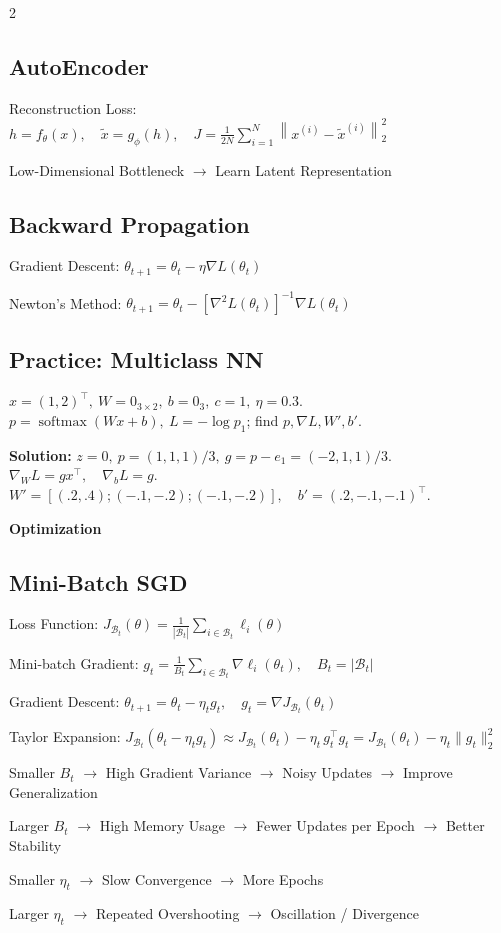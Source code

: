\documentclass[a4paper]{article}
\newcommand{\module}[1]{\par\needspace{45pt}\addvspace{4pt}\noindent\colorbox{accent}{\parbox{\dimexpr\linewidth-2\fboxsep\relax}{\color{white}\sffamily\bfseries\fontsize{10}{12}\selectfont #1}}\par\vspace{1pt}}
\let\originalsum\sum
\renewcommand{\sum}{\mathop{\textstyle\originalsum}\nolimits}
\begin{document}
\begin{multicols}{2}
\subsection*{AutoEncoder}
\noindent Reconstruction Loss: \(\displaystyle h=f_\theta(x),\quad \tilde x=g_\phi(h), \quad J=\frac1{2N}\sum_{i=1}^{N}\left\|x^{(i)}-\tilde x^{(i)}\right\|_2^2\)\par
\noindent Low-Dimensional Bottleneck \(\to\) Learn Latent Representation\par
\subsection*{Backward Propagation}
Gradient Descent: \(\displaystyle\theta_{t+1}=\theta_t-\eta\nabla L(\theta_t)\)\par
Newton's Method: \(\displaystyle\theta_{t+1}=\theta_t-\left[\nabla^2 L(\theta_t)\right]^{-1}\nabla L(\theta_t)\)\par
\subsection*{Practice: Multiclass NN}
\noindent \(x=(1,2)^\top,\ W=0_{3\times2},\ b=0_3,\ c=1,\ \eta=0.3\).\\
\(p=\operatorname{softmax}(Wx+b),\ L=-\log p_1\); find \(p,\nabla L,W',b'\).\par
\noindent \textbf{Solution:} \(z=0,\ p=(1,1,1)/3,\ g=p-e_1=(-2,1,1)/3\).\\
\(\nabla_W L=gx^\top,\quad \nabla_b L=g\).\\
\(W'=[(.2,.4);(-.1,-.2);(-.1,-.2)],\quad b'=(.2,-.1,-.1)^\top\).\par
\columnbreak
\module{Optimization}
\subsection*{Mini-Batch SGD}
\noindent Loss Function: \(\displaystyle J_{\mathcal{B}_t}(\theta) = \frac{1}{|\mathcal{B}_t|}\sum_{i\in\mathcal{B}_t} \ell_i(\theta)\)\par
\noindent Mini-batch Gradient: \(\displaystyle g_t=\frac{1}{B_t}\sum_{i\in\mathcal B_t}\nabla\ell_i(\theta_t),\quad B_t=|\mathcal B_t|\)\par
\noindent Gradient Descent: \(\displaystyle \theta_{t+1}=\theta_t-\eta_tg_t,\quad g_t=\nabla J_{\mathcal B_t}(\theta_t)\)\par
\noindent Taylor Expansion: \(\displaystyle J_{\mathcal{B}_t}(\theta_t - \eta_t g_t) \approx J_{\mathcal{B}_t}(\theta_t) - \eta_t\, g_t^\top g_t = J_{\mathcal{B}_t}(\theta_t) - \eta_t\|g_t\|_2^2\)\par
\noindent Smaller \(\displaystyle B_t\) \(\to\) High Gradient Variance \(\to\) Noisy Updates \(\to\) Improve Generalization\par
\noindent Larger \(\displaystyle B_t\) \(\to\) High Memory Usage \(\to\) Fewer Updates per Epoch \(\to\) Better Stability\par
\noindent Smaller \(\displaystyle \eta_t\) \(\to\) Slow Convergence \(\to\) More Epochs\par
\noindent Larger \(\displaystyle \eta_t\) \(\to\) Repeated Overshooting \(\to\) Oscillation / Divergence\par

\end{multicols}
\end{document}
